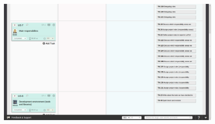 \begin{figure}[H]
\includegraphics[width=\textwidth]{ch/sprints/fig/addsTasks.png}
\label{fig:addsTasks}
\end{figure}
